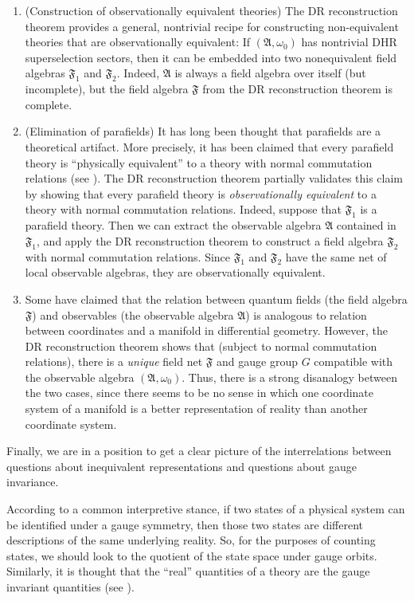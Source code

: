 \documentclass[12pt]{article}
\newcommand{\alg}[1]{\mathfrak{#1}}
\theoremstyle{definition}
\theoremstyle{definition}
\theoremstyle{remark}
\def\al#1{{\mathfrak #1}}
\def\om{\omega} \def\Om{\Omega} \def\dd{\partial} \def\D{\Delta}
\begin{document}
\begin{enumerate}
\item (Construction of observationally equivalent theories) The DR
  reconstruction theorem provides a general, nontrivial recipe for
  constructing non-equivalent theories that are observationally
  equivalent: If $(\alg{A},\om _0)$ has nontrivial DHR superselection
  sectors, then it can be embedded into two nonequivalent field
  algebras $\alg{F}_1$ and $\alg{F}_2$.  Indeed, $\alg{A}$ is always a
  field algebra over itself (but incomplete), but the field algebra
  $\alg{F}$ from the DR reconstruction theorem is complete.
  \item (Elimination of parafields) It has long been thought that
  parafields are a theoretical artifact.  More precisely, it has been
  claimed that every parafield theory is ``physically equivalent'' to
  a theory with normal commutation relations (see \cite{araki-para}).
  The DR reconstruction theorem partially validates this claim by
  showing that every parafield theory is \emph{observationally
    equivalent} to a theory with normal commutation relations.
  Indeed, suppose that $\alg{F}_1$ is a parafield theory.  Then we can
  extract the observable algebra $\alg{A}$ contained in $\alg{F}_1$,
  and apply the DR reconstruction theorem to construct a field algebra
  $\alg{F}_2$ with normal commutation relations.  Since $\alg{F}_1$
  and $\alg{F}_2$ have the same net of local observable algebras, they
  are observationally equivalent.
\item \noindent Some have claimed that the relation between quantum
  fields (the field algebra $\al F$) and observables (the observable
  algebra $\al A$) is analogous to relation between coordinates and a
  manifold in differential geometry.  However, the DR reconstruction
  theorem shows that (subject to normal commutation relations), there
  is a \emph{unique} field net $\alg{F}$ and gauge group $G$
  compatible with the observable algebra $(\alg{A},\om _0)$.  Thus,
  there is a strong disanalogy between the two cases, since there
  seems to be no sense in which one coordinate system of a manifold is
  a better representation of reality than another coordinate system.
\end{enumerate}

Finally, we are in a position to get a clear picture of the
interrelations between questions about inequivalent representations
and questions about gauge invariance.

According to a common interpretive stance, if two states of a physical
system can be identified under a gauge symmetry, then those two states
are different descriptions of the same underlying reality.  So, for
the purposes of counting states, we should look to the quotient of the
state space under gauge orbits.  Similarly, it is thought that the
``real'' quantities of a theory are the gauge invariant quantities
(see \cite{ear}).
\end{document}
